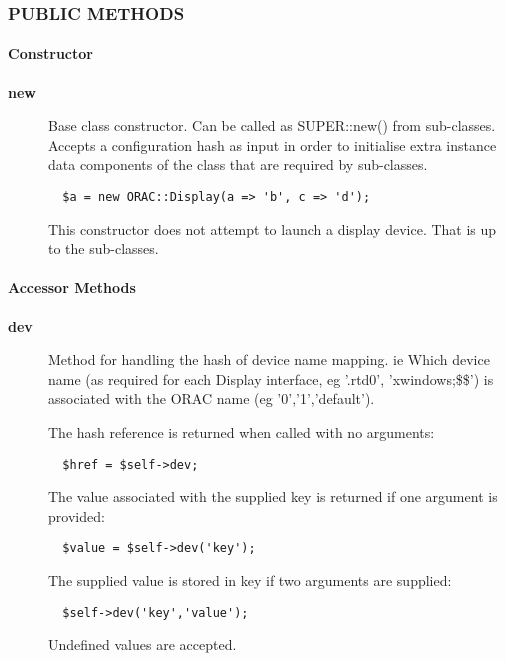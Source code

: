 \subsubsection*{PUBLIC METHODS\label{ORAC::Display::Base_PUBLIC_METHODS}}\paragraph*{Constructor\label{ORAC::Display::Base_Constructor}}\begin{description}
\item[\textbf{new}] \mbox{}

Base class constructor. Can be called as SUPER::new() from
sub-classes. Accepts a configuration hash as input in order to
initialise extra instance data components of the class that are
required by sub-classes.

\begin{verbatim}
  $a = new ORAC::Display(a => 'b', c => 'd');
\end{verbatim}


This constructor does not attempt to launch a display device.
That is up to the sub-classes.

\end{description}
\paragraph*{Accessor Methods\label{ORAC::Display::Base_Accessor_Methods}}\begin{description}
\item[\textbf{dev}] \mbox{}

Method for handling the hash of device name mapping. ie Which 
device name (as required for each Display interface, eg '.rtd0',
'xwindows;\$\$') is associated with the ORAC name (eg '0','1','default').



The hash reference is returned when called with no arguments:

\begin{verbatim}
  $href = $self->dev;
\end{verbatim}


The value associated with the supplied key is returned if one
argument is provided:

\begin{verbatim}
  $value = $self->dev('key');
\end{verbatim}


The supplied value is stored in key if two arguments are supplied:

\begin{verbatim}
  $self->dev('key','value');
\end{verbatim}


Undefined values are accepted.

\end{description}
